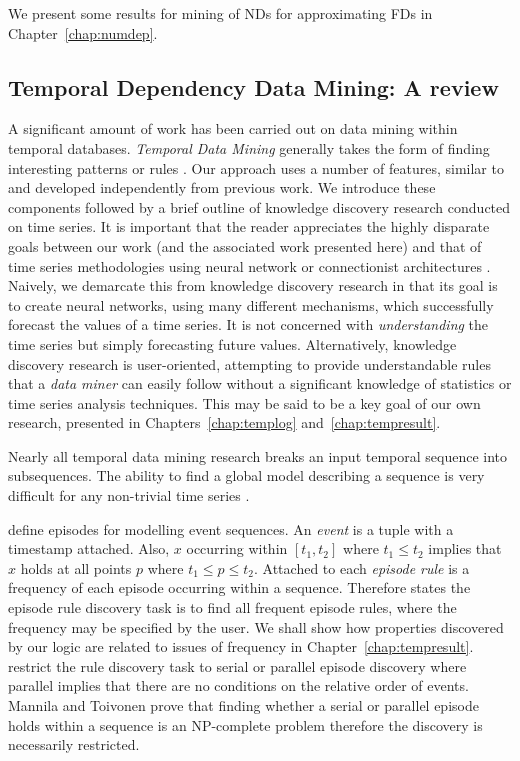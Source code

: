 \medskip
We present some results
for mining of NDs for approximating FDs in Chapter~\ref{chap:numdep}. 


\subsection{Temporal Dependency Data Mining: A review}\label{subsec:temp_mine}

A significant amount of work has been carried out on data mining
within temporal databases. {\em Temporal Data Mining} generally takes
the form of finding interesting patterns \cite{bt98} or rules
\cite{dlm98,mt96}. Our approach uses a number of features, similar to
and developed independently from
previous work. We introduce these components followed by a brief
outline of knowledge discovery research conducted on time series. It
is important that the reader appreciates the highly disparate goals
between our work (and the associated work presented here) and that of
time series methodologies using neural network or connectionist architectures
\cite{wg94,fc95}. Naively, we demarcate this from knowledge discovery
research in that its goal is to create neural networks, using many
different mechanisms, which successfully forecast the values of a time
series. It is not concerned with {\em understanding} the time series
but simply forecasting future values. Alternatively,
knowledge discovery research is user-oriented, attempting to provide
understandable rules that a {\em data miner} can easily follow
without a significant knowledge of statistics or time series analysis
techniques. This may be said to be a key goal of our own research,
presented in Chapters~\ref{chap:templog} and~\ref{chap:tempresult}.

\medskip

Nearly all temporal data mining research breaks an input temporal sequence into
subsequences. The ability to find a global model describing a sequence
is very difficult for any non-trivial time series \cite{end95}.

\medskip
{}
\cite{mtv95,mt96,mt96b} define episodes for modelling event
sequences. An {\em event} is a tuple with a timestamp attached. Also, $x$
occurring within $[ t_1, t_2 ]$ where $t_1 \le t_2$ implies that $x$
holds at all points $p$ where $t_1 \le p \le t_2$. Attached to each
{\em episode rule} is a frequency of each episode occurring
within a sequence. Therefore \cite{mt96} states the episode rule
discovery task is to find all frequent episode rules, where the
frequency may be specified by the user. We shall show how properties
discovered by our logic are related to issues of frequency in
Chapter~\ref{chap:tempresult}. \cite{mt96} restrict the rule
discovery task to serial or parallel episode discovery where parallel
implies that there are no conditions on the relative order of events.
Mannila and Toivonen prove that finding whether a serial or parallel
episode holds within a sequence is an NP-complete problem therefore
the discovery is necessarily restricted.

